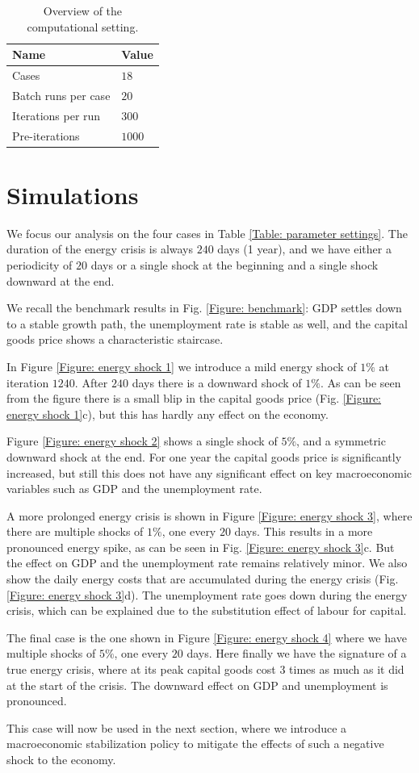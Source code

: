\begin{table}[tbp]
\caption{Overview of the computational setting.}
\label{Table: computational setting}
\centering
\begin{tabular}{ll}
\hline\hline
Name & Value \\ \hline
Cases & $18$ \\
Batch runs per case & $20$ \\
Iterations per run & $300$ \\
Pre-iterations & $1000$ \\ \hline
\end{tabular}%
\end{table}

\section{Simulations}
We focus our analysis on the four cases in Table \ref{Table: parameter settings}.
The duration of the energy crisis is always $240$ days (1 year), and we
have either a periodicity of $20$ days or a single shock at the beginning and a single shock downward at the end.

We recall the benchmark results in Fig. \ref{Figure: benchmark}: GDP settles down to a stable growth path, the unemployment rate is stable as well, and the capital goods price shows a characteristic staircase.

In Figure \ref{Figure: energy shock 1} we introduce a mild energy shock of $1\%$ at iteration $1240$.
After $240$ days there is a downward shock of $1\%$. As can be seen from the figure there is a small blip in the capital goods price (Fig. \ref{Figure: energy shock 1}c), but this has hardly any effect on the economy.

Figure \ref{Figure: energy shock 2} shows a single shock of $5\%$, and a symmetric downward shock at the end.
For one year the capital goods price is significantly increased, but still this does not have any significant effect on key macroeconomic variables such as GDP and the unemployment rate.

A more prolonged energy crisis is shown in Figure \ref{Figure: energy shock 3}, where there are multiple shocks of $1\%$, one every $20$ days. This results in a more pronounced energy spike, as can be seen in Fig. \ref{Figure: energy shock 3}c. But the effect on GDP and the unemployment rate remains relatively minor. 
We also show the daily energy costs that are accumulated during the energy crisis (Fig. \ref{Figure: energy shock 3}d). The unemployment rate goes down during the energy crisis, which can be explained due to the substitution effect of labour for capital.

The final case is the one shown in Figure \ref{Figure: energy shock 4} where we have multiple shocks of $5\%$, one every $20$ days. Here finally we have the signature of a true energy crisis, where at its peak capital goods cost 3 times as much as it did at the start of the crisis. The downward effect on GDP and unemployment is pronounced.

This case will now be used in the next section, where we introduce a macroeconomic stabilization policy to mitigate the effects of such a negative shock to the economy.
